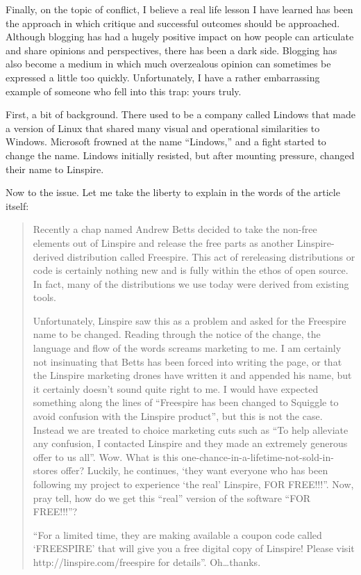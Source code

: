 Finally, on the topic of conflict, I believe a real life lesson I have learned has been the approach in which critique and successful outcomes should be approached. Although blogging has had a hugely positive impact on how people can articulate and share opinions and perspectives, there has been a dark side. Blogging has also become a medium in which much overzealous opinion can sometimes be expressed a little too quickly. Unfortunately, I have a rather embarrassing example of someone who fell into this trap: yours truly.

First, a bit of background. There used to be a company called Lindows that made a version of Linux that shared many visual and operational similarities to Windows. Microsoft frowned at the name “Lindows,” and a fight started to change the name. Lindows initially resisted, but after mounting pressure, changed their name to Linspire.

Now to the issue. Let me take the liberty to explain in the words of the article itself:
\begin{quote}
 Recently a chap named Andrew Betts decided to take the non-free elements out of Linspire and release the free parts as another Linspire-derived distribution called Freespire. This act of rereleasing distributions or code is certainly nothing new and is fully within the ethos of open source. In fact, many of the distributions we use today were derived from existing tools.

Unfortunately, Linspire saw this as a problem and asked for the Freespire name to be changed. Reading through the notice of the change, the language and flow of the words screams marketing to me. I am certainly not insinuating that Betts has been forced into writing the page, or that the Linspire marketing drones have written it and appended his name, but it certainly doesn’t sound quite right to me. I would have expected something along the lines of “Freespire has been changed to Squiggle to avoid confusion with the Linspire product”, but this is not the case. Instead we are treated to choice marketing cuts such as “To help alleviate any confusion, I contacted Linspire and they made an extremely generous offer to us all”. Wow. What is this one-chance-in-a-lifetime-not-sold-in-stores offer? Luckily, he continues, ‘they want everyone who has been following my project to experience ‘the real’ Linspire, FOR FREE!!!”. Now, pray tell, how do we get this “real” version of the software “FOR FREE!!!”?

“For a limited time, they are making available a coupon code called ‘FREESPIRE’ that will give you a free digital copy of Linspire! Please visit http://linspire.com/freespire for details”. Oh…thanks.
\end{quote}

